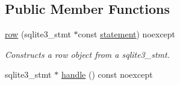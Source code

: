 \subsection*{Public Member Functions}
\begin{DoxyCompactItemize}
\item 
\hypertarget{a00011_ade44769ac78d6eff1aa20c20a09e4a79}{\hyperlink{a00011_ade44769ac78d6eff1aa20c20a09e4a79}{row} (sqlite3\-\_\-stmt $\ast$const \hyperlink{a00013}{statement}) noexcept}\label{a00011_ade44769ac78d6eff1aa20c20a09e4a79}

\begin{DoxyCompactList}\small\item\em Constructs a row object from a sqlite3\-\_\-stmt. \end{DoxyCompactList}\item 
\hypertarget{a00011_a6ee9eb13492a23d440abe1fe903bafc8}{sqlite3\-\_\-stmt $\ast$ \hyperlink{a00011_a6ee9eb13492a23d440abe1fe903bafc8}{handle} () const noexcept}\label{a00011_a6ee9eb13492a23d440abe1fe903bafc8}


\end{DoxyCompactItemize}
